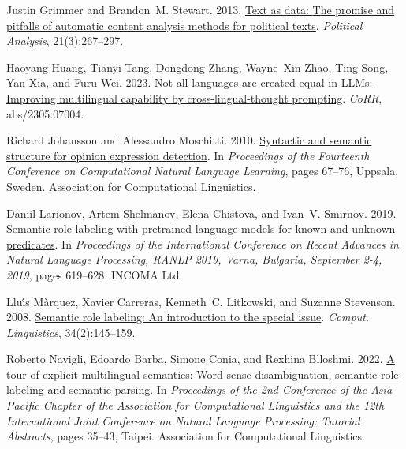 \documentclass[11pt,a4paper]{article}
\begin{document}
\begin{thebibliography}{26}
  Justin Grimmer and Brandon~M. Stewart. 2013.
  \newblock \href {https://doi.org/10.1093/pan/mps028} {Text as data: {T}he
    promise and pitfalls of automatic content analysis methods for political
    texts}.
  \newblock \emph{Political Analysis}, 21(3):267--297.
  
  Haoyang Huang, Tianyi Tang, Dongdong Zhang, Wayne~Xin Zhao, Ting Song, Yan Xia,
    and Furu Wei. 2023.
  \newblock \href {https://doi.org/10.48550/arXiv.2305.07004} {Not all languages
    are created equal in {LLMs}: {I}mproving multilingual capability by
    cross-lingual-thought prompting}.
  \newblock \emph{CoRR}, abs/2305.07004.
  
  Richard Johansson and Alessandro Moschitti. 2010.
  \newblock \href {https://aclanthology.org/W10-2910} {Syntactic and semantic
    structure for opinion expression detection}.
  \newblock In \emph{Proceedings of the Fourteenth Conference on Computational
    Natural Language Learning}, pages 67--76, Uppsala, Sweden. Association for
    Computational Linguistics.
  
  Daniil Larionov, Artem Shelmanov, Elena Chistova, and Ivan~V. Smirnov. 2019.
  \newblock \href {https://doi.org/10.26615/978-954-452-056-4\_073} {Semantic
    role labeling with pretrained language models for known and unknown
    predicates}.
  \newblock In \emph{Proceedings of the International Conference on Recent
    Advances in Natural Language Processing, {RANLP} 2019, Varna, Bulgaria,
    September 2-4, 2019}, pages 619--628. {INCOMA} Ltd.
  
  Llu{\'{\i}}s M{\`{a}}rquez, Xavier Carreras, Kenneth~C. Litkowski, and Suzanne
    Stevenson. 2008.
  \newblock \href {https://doi.org/10.1162/coli.2008.34.2.145} {Semantic role
    labeling: An introduction to the special issue}.
  \newblock \emph{Comput. Linguistics}, 34(2):145--159.
  
  Roberto Navigli, Edoardo Barba, Simone Conia, and Rexhina Blloshmi. 2022.
  \newblock \href {https://aclanthology.org/2022.aacl-tutorials.6} {A tour of
    explicit multilingual semantics: Word sense disambiguation, semantic role
    labeling and semantic parsing}.
  \newblock In \emph{Proceedings of the 2nd Conference of the Asia-Pacific
    Chapter of the Association for Computational Linguistics and the 12th
    International Joint Conference on Natural Language Processing: Tutorial
    Abstracts}, pages 35--43, Taipei. Association for Computational Linguistics.
  

\end{thebibliography}
\end{document}
